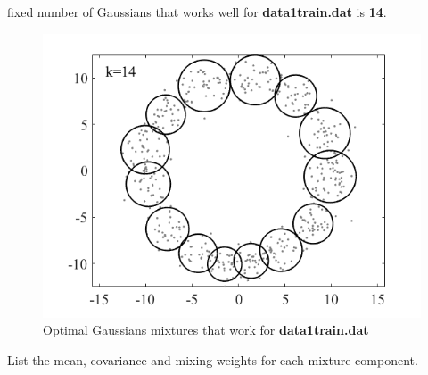 \documentclass{article}
\begin{document}
fixed number of Gaussians that works well for \textbf{data1train.dat} is \textbf{14}.

\begin{figure}[h!]
\centering
\includegraphics[scale=0.6]{fig/HW6P1_12.png}
\caption{Optimal Gaussians mixtures that work for \textbf{data1train.dat}}
\end{figure}


\newpage
List the mean, covariance and mixing weights for each mixture component.
\end{document}
